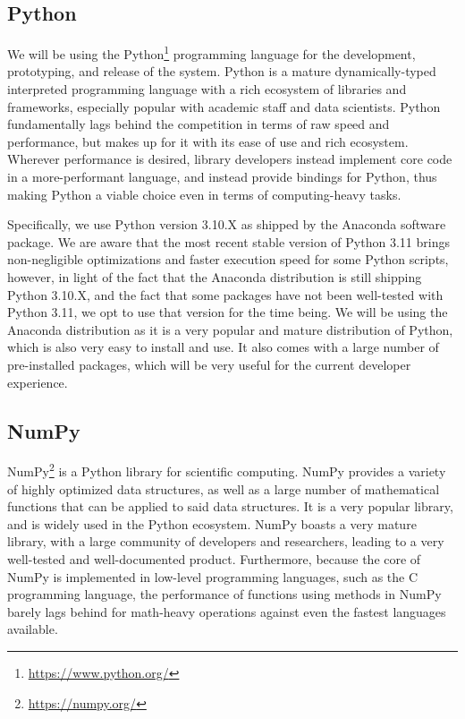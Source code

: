 \subsection{Python}
We will be using the Python\footnote{\url{https://www.python.org/}} programming language for the development, prototyping, and release of the system. Python is a mature dynamically-typed interpreted programming language with a rich ecosystem of libraries and frameworks, especially popular with academic staff and data scientists. Python fundamentally lags behind the competition in terms of raw speed and performance, but makes up for it with its ease of use and rich ecosystem. Wherever performance is desired, library developers instead implement core code in a more-performant language, and instead provide bindings for Python, thus making Python a viable choice even in terms of computing-heavy tasks. 

Specifically, we use Python version 3.10.X as shipped by the Anaconda software package. We are aware that the most recent stable version of Python 3.11 brings non-negligible optimizations and faster execution speed for some Python scripts, however, in light of the fact that the Anaconda distribution is still shipping Python 3.10.X, and the fact that some packages have not been well-tested with Python 3.11, we opt to use that version for the time being. We will be using the Anaconda distribution as it is a very popular and mature distribution of Python, which is also very easy to install and use. It also comes with a large number of pre-installed packages, which will be very useful for the current developer experience.

\subsection{NumPy}

NumPy\footnote{\url{https://numpy.org/}} is a Python library for scientific computing. NumPy provides a variety of highly optimized data structures, as well as a large number of mathematical functions that can be applied to said data structures. It is a very popular library, and is widely used in the Python ecosystem. NumPy boasts a very mature library, with a large community of developers and researchers, leading to a very well-tested and well-documented product. Furthermore, because the core of NumPy is implemented in low-level programming languages, such as the C programming language, the performance of functions using methods in NumPy barely lags behind for math-heavy operations against even the fastest languages available. 


